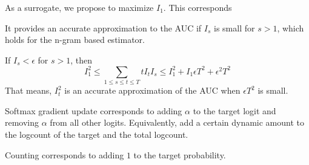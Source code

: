 \documentclass[11pt,letterpaper]{article}
\begin{document}
As a surrogate, we propose to maximize $I_1$.
This corresponds

It provides an accurate approximation to the AUC if $I_s$ is small for $s > 1$, which holds for the n-gram based estimator.

If $I_s < \epsilon$ for $s > 1$, then 
\begin{equation}
	I_1^2 \leq \sum_{1\leq s \leq t \leq T}  tI_t I_s \leq I_1^2 + I_1 \epsilon T^2 + \epsilon^2 T^2
\end{equation}
That means, $I_t^2$ is an accurate approximation of the AUC when $\epsilon T^2$ is small.


Softmax gradient update corresponds to adding $\alpha$ to the target logit and removing $\alpha$ from all other logits.
Equivalently, add a certain dynamic amount to the logcount of the target and the total logcount.



Counting corresponds to adding $1$ to the target probability. 







\end{document}
